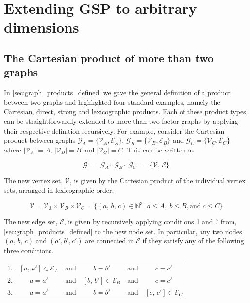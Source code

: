 \section{Extending GSP to arbitrary dimensions}

\subsection{The Cartesian product of more than two graphs}

In \cref{sec:graph_products_defined} we gave the general definition of a product between two graphs and highlighted four standard examples, namely the Cartesian, direct, strong and lexicographic products. Each of these product types can be straightforwardly extended to more than two factor graphs by applying their respective definition recursively. For example, consider the Cartesian product between graphs $\mathcal{G}_A = \{\mathcal{V}_A, \mathcal{E}_A\}$, $\mathcal{G}_B = \{\mathcal{V}_B, \mathcal{E}_B\}$ and $\mathcal{G}_C = \{\mathcal{V}_C, \mathcal{E}_C\}$ where $|\mathcal{V}_A| = A$, $|\mathcal{V}_B| = B$ and $|\mathcal{V}_C| = C$. This can be written as 

\begin{equation}
    \mathcal{G} \; = \; \mathcal{G}_A \, \square \; \mathcal{G}_B \, \square \; \mathcal{G}_C \; = \; \{\mathcal{V}, \, \mathcal{E}\}
\end{equation}

The new vertex set, $\mathcal{V}$, is given by the Cartesian product of the individual vertex sets, arranged in lexicographic order. 

\begin{equation}
    \mathcal{V} = \mathcal{V}_A \times \mathcal{V}_B \times \mathcal{V}_C = \{(a, \, b, \, c) \in \mathbb{N}^3 \, | \, a \leq A, \; b \leq B, \text{and} \;  c \leq C\}
\end{equation}

The new edge set, $\mathcal{E}$, is given by recursively applying conditions 1 and 7 from, \cref{sec:graph_products_defined} to the new node set. In particular, any two nodes $(a, \, b, \, c)$ and $(a', b', c')$ are connected in $\mathcal{E}$ if they satisfy any of the following three conditions. 

\vspace{0.5cm}

\begin{table}[h]
    \def\arraystretch{1.5}
    \centering
    \begin{tabular}{lclclc}
        1. & $[a, \, a'] \in \mathcal{E}_A$    & and & $b = b'$  & and & $c = c'$             \\
        2. & $a = a'$    & and & $[b, \, b'] \in \mathcal{E}_B$   & and & $c = c'$             \\
        3. & $a = a'$    & and & $b = b'$  & and & $[c, \, c'] \in \mathcal{E}_C$              \\
    \end{tabular}
\end{table}


